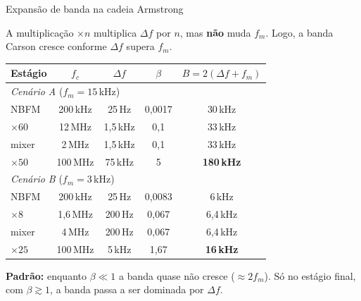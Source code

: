 
\begin{frame}[shrink=10]{Expansão de banda na cadeia Armstrong}

A multiplicação $\times n$ multiplica $\Delta f$ por $n$, mas \textbf{não} muda $f_m$. Logo, a banda Carson cresce conforme $\Delta f$ supera $f_m$.

\begin{center}
\footnotesize
\begin{tabular}{lcccc}
\toprule
Estágio & $f_c$ & $\Delta f$ & $\beta$ & $B = 2(\Delta f + f_m)$ \\
\midrule
\multicolumn{5}{l}{\emph{Cenário A} ($f_m = 15$\,kHz)} \\
NBFM             & 200\,kHz  & 25\,Hz     & 0{,}0017 & 30\,kHz  \\
$\times 60$      & 12\,MHz   & 1{,}5\,kHz & 0{,}1    & 33\,kHz  \\
mixer            & 2\,MHz    & 1{,}5\,kHz & 0{,}1    & 33\,kHz  \\
$\times 50$      & 100\,MHz  & 75\,kHz    & 5        & \textbf{180\,kHz} \\
\midrule
\multicolumn{5}{l}{\emph{Cenário B} ($f_m = 3$\,kHz)} \\
NBFM             & 200\,kHz   & 25\,Hz   & 0{,}0083 & 6\,kHz   \\
$\times 8$       & 1{,}6\,MHz & 200\,Hz  & 0{,}067  & 6{,}4\,kHz \\
mixer            & 4\,MHz     & 200\,Hz  & 0{,}067  & 6{,}4\,kHz \\
$\times 25$      & 100\,MHz   & 5\,kHz   & 1{,}67   & \textbf{16\,kHz}  \\
\bottomrule
\end{tabular}
\end{center}

\small
\textbf{Padrão:} enquanto $\beta \ll 1$ a banda quase não cresce ($\approx 2 f_m$). Só no estágio final, com $\beta \gtrsim 1$, a banda passa a ser dominada por $\Delta f$.

\end{frame}


